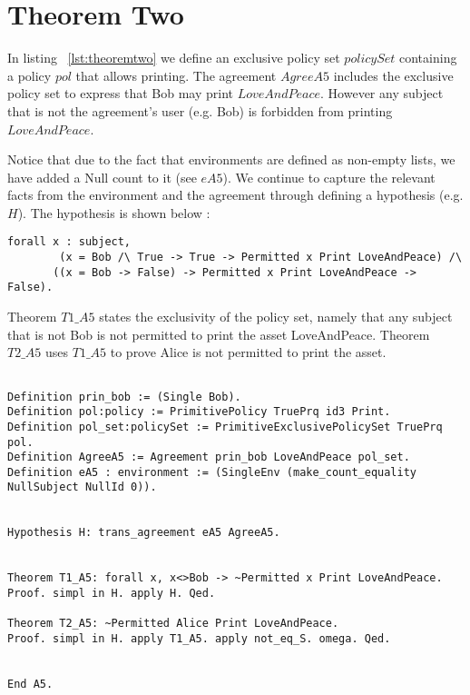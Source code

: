 \section{Theorem Two}

In listing ~\ref{lst:theoremtwo} we define an exclusive policy set $policySet$ containing a policy $pol$ that allows printing. The agreement $AgreeA5$ includes the exclusive policy set to express that Bob may print $LoveAndPeace$. However any subject that is not the agreement's user (e.g. Bob) is forbidden from printing $LoveAndPeace$. 

Notice that due to the fact that environments are defined as non-empty lists, we have added a Null count to it (see $eA5$). We continue to capture the relevant facts from the environment and the agreement through defining a hypothesis (e.g. $H$). The hypothesis is shown below : 

\lstset{language=Coq}
\begin{lstlisting}[frame=single, caption={Hypothesis for Theorem Two}, label={lst:theoremtwohypo}]
forall x : subject, 
        (x = Bob /\ True -> True -> Permitted x Print LoveAndPeace) /\
       ((x = Bob -> False) -> Permitted x Print LoveAndPeace -> False). 
\end{lstlisting}

Theorem $T1\_A5$ states the exclusivity of the policy set, namely that any subject that is not Bob is not permitted to print the asset LoveAndPeace. Theorem $T2\_A5$ uses $T1\_A5$ to prove Alice is not permitted to print the asset.

\lstset{language=Coq}
\begin{lstlisting}[frame=single, caption={Theorem Two},label={lst:theoremtwo}]

Definition prin_bob := (Single Bob).
Definition pol:policy := PrimitivePolicy TruePrq id3 Print.
Definition pol_set:policySet := PrimitiveExclusivePolicySet TruePrq pol.
Definition AgreeA5 := Agreement prin_bob LoveAndPeace pol_set.
Definition eA5 : environment := (SingleEnv (make_count_equality NullSubject NullId 0)).


Hypothesis H: trans_agreement eA5 AgreeA5.


Theorem T1_A5: forall x, x<>Bob -> ~Permitted x Print LoveAndPeace.
Proof. simpl in H. apply H. Qed.

Theorem T2_A5: ~Permitted Alice Print LoveAndPeace.
Proof. simpl in H. apply T1_A5. apply not_eq_S. omega. Qed.


End A5.


\end{lstlisting}


